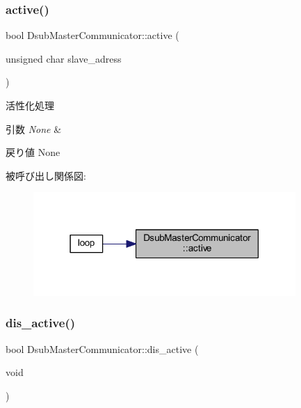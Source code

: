 \subsubsection{\texorpdfstring{active()}{active()}}
{\footnotesize\ttfamily bool Dsub\+Master\+Communicator\+::active (\begin{DoxyParamCaption}\item[{unsigned char}]{slave\+\_\+adress }\end{DoxyParamCaption})}



活性化処理 


\begin{DoxyParams}{引数}
{\em None} & \\
\hline
\end{DoxyParams}
\begin{DoxyReturn}{戻り値}
None 
\end{DoxyReturn}
被呼び出し関係図\+:
\nopagebreak
\begin{figure}[H]
\begin{center}
\leavevmode
\includegraphics[width=283pt]{class_dsub_master_communicator_af8b31c088520cc95c05df13be86627f8_icgraph}
\end{center}
\end{figure}
\mbox{\label{class_dsub_master_communicator_ac0a9298c691adbdf844f85d680d7e554}} 
\subsubsection{\texorpdfstring{dis\_active()}{dis\_active()}}
{\footnotesize\ttfamily bool Dsub\+Master\+Communicator\+::dis\+\_\+active (\begin{DoxyParamCaption}\item[{void}]{ }\end{DoxyParamCaption})}



